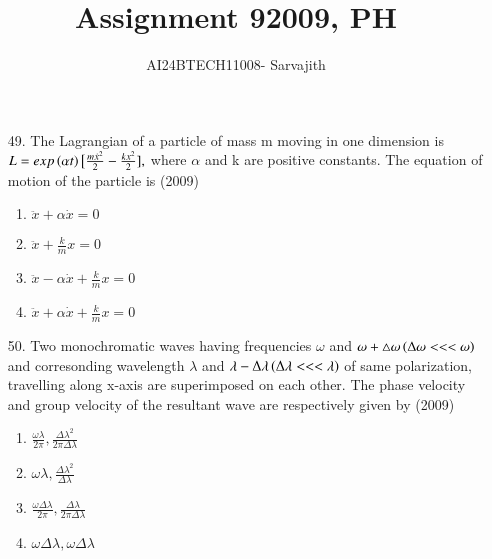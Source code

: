 \documentclass[journal]{IEEEtran}
\begin{document}

\vspace{3cm}


\author{AI24BTECH11008- Sarvajith
}
\title{Assignment 9}
{\let\newpage\relax\maketitle}
\title{2009, PH}
\renewcommand{\thefigure}{\theenumi}
\renewcommand{\thetable}{\theenumi}
\setlength{\intextsep}{10pt} %
\renewcommand{\thetable}{\theenumi}
\begin{enumerate}
    \item[49.] The Lagrangian of a particle of mass m moving in one dimension is $ L = exp\left(\alpha t\right)\big[\frac{m\dot{x}^2}{2}-\frac{kx^2}{2}],$ where $\alpha$ and k are positive constants. The equation of motion of the particle is  \hfill (2009)
     \begin{enumerate}[label=(\Alph*)]
        \item $\ddot{x}+\alpha \dot{x} = 0$
        \item $\ddot{x}+\frac{k}{m}x = 0$
        \item $\ddot{x}-\alpha \dot{x}+\frac{k}{m}x = 0$
        \item $\ddot{x}+\alpha \dot{x}+\frac{k}{m}x = 0$
     \end{enumerate}
     \item[50.] Two monochromatic waves having frequencies $\omega$ and $\omega + \triangle \omega \left(\Delta\omega<<<\omega\right)$ and corresonding wavelength $\lambda$ and $\lambda-\Delta\lambda\left(\Delta\lambda<<<\lambda\right)$ of same polarization, travelling along x-axis are superimposed on each other. The phase velocity and group velocity of the resultant wave are respectively given by \hfill (2009)
     \begin{enumerate}[label=(\Alph*)]
         \item $\frac{\omega\lambda}{2\pi},\frac{\Delta\lambda ^2}{2\pi\Delta\lambda}$
         \item $\omega\lambda,\frac{\Delta\lambda ^2}{\Delta\lambda}$
         \item $\frac{\omega\Delta\lambda}{2\pi},\frac{\Delta\lambda}{2\pi\Delta\lambda}$
         \item $\omega\Delta\lambda,\omega\Delta\lambda$

\end{enumerate}
\end{enumerate}
\end{document}
